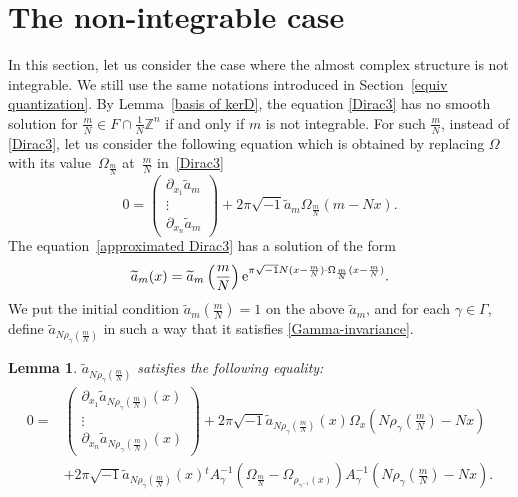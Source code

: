 \documentclass[pdftex]{sigma}
\numberwithin{equation}{section}
\newtheorem{Lemma}[Theorem]{Lemma}
\newcommand{\Z}{\mathbb{Z}}
\renewcommand{\tilde}{\widetilde}
\begin{document}
\section{The non-integrable case}\label{approximation}
In this section, let us consider the case where the almost complex structure is not integrable. We still use the same notations introduced in Section~\ref{equiv quantization}.
By Lemma~\ref{basis of kerD}, the equation \eqref{Dirac3} has no smooth solution for $\frac{m}{N}\in F\cap \frac{1}{N}\Z^n$ if and only if $m$ is not integrable. For such $\frac{m}{N}$, instead of \eqref{Dirac3}, let us consider the following equation which is obtained by replacing $\Omega$ with its value~$\Omega_{\frac{m}{N}}$ at~$\frac{m}{N}$ in~\eqref{Dirac3}
\begin{equation}\label{approximated Dirac3}
0=
\begin{pmatrix}
\partial_{x_1}{\tilde a}_m\\
\vdots \\
\partial_{x_n}{\tilde a}_m
\end{pmatrix}
+2\pi\sqrt{-1}{\tilde a}_m\Omega_{\frac{m}{N}}
(m-Nx).
\end{equation}
The equation~\eqref{approximated Dirac3} has a solution of the form
\begin{equation*}
{\tilde a}_m(x)={\tilde a}_m\left(\frac{m}{N}\right){\rm e}^{\pi\sqrt{-1}N(x-\frac{m}{N})\cdot \Omega_{\frac{m}{N}}(x-\frac{m}{N})}.
\end{equation*}
We put the initial condition ${\tilde a}_m(\frac{m}{N})=1$ on the above ${\tilde a}_m$, and for each $\gamma \in \Gamma$, define ${\tilde a}_{N\rho_\gamma (\frac{m}{N})}$ in such a way that it satisfies \eqref{Gamma-invariance}.
\begin{Lemma}
${\tilde a}_{N\rho_\gamma (\frac{m}{N})}$ satisfies the following equality:
\begin{align}
0={}&
\begin{pmatrix}
\partial_{x_1}{\tilde a}_{N\rho_\gamma (\frac{m}{N})}(x)\\
\vdots \\
\partial_{x_n}{\tilde a}_{N\rho_\gamma (\frac{m}{N})}(x)
\end{pmatrix}
+2\pi\sqrt{-1}{\tilde a}_{N\rho_\gamma (\frac{m}{N})}(x)\Omega_x \left({N\rho_\gamma \left(\frac{m}{N}\right)}-Nx\right) \nonumber \\
&+2\pi\sqrt{-1}{\tilde a}_{N\rho_\gamma (\frac{m}{N})}(x){}^tA_{\gamma}^{-1}( \Omega_{\frac{m}{N}}-\Omega_{\rho_{\gamma^{-1}}(x)}) A_{\gamma}^{-1}\left({N\rho_\gamma \left(\frac{m}{N}\right)}-Nx\right).\label{approximated DE for a_m}
\end{align}
\end{Lemma}
\end{document}
